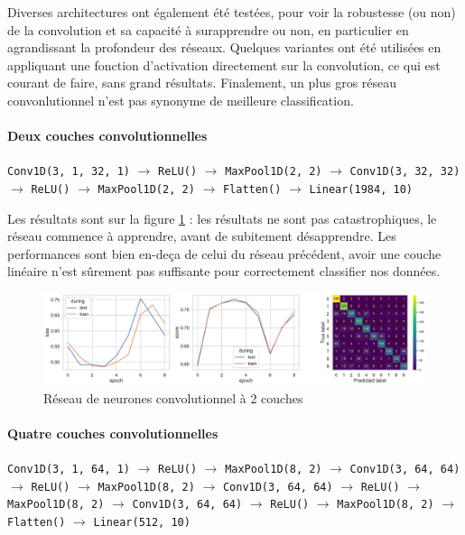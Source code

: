 \documentclass{article}
\begin{document}
Diverses architectures ont également été testées, pour voir la robustesse (ou non) de la convolution et sa capacité à surapprendre ou non, en particulier en agrandissant la profondeur des réseaux. Quelques variantes ont été utilisées en appliquant une fonction d'activation directement sur la convolution, ce qui est courant de faire, sans grand résultats. Finalement, un plus gros réseau convonlutionnel n'est pas synonyme de meilleure classification.

\paragraph*{Deux couches convolutionnelles} 

\texttt{Conv1D(3, 1, 32, 1)} $\rightarrow$ \texttt{ReLU()} $\rightarrow$ \texttt{MaxPool1D(2, 2)} $\rightarrow$
\texttt{Conv1D(3, 32, 32)} $\rightarrow$ \texttt{ReLU()} $\rightarrow$ \texttt{MaxPool1D(2, 2)} $\rightarrow$
\texttt{Flatten()} $\rightarrow$
\texttt{Linear(1984, 10)}

Les résultats sont sur la figure \ref*{fig:conv2layers} : les résultats ne sont pas catastrophiques, le réseau commence à apprendre, avant de subitement désapprendre. Les performances sont bien en-deça de celui du réseau précédent, avoir une couche linéaire n'est sûrement pas suffisante pour correctement classifier nos données.

\begin{figure}[htbp]
    \centering
    \includegraphics[width=\textwidth]{conv/conv_2layers.pdf}
    \caption{Réseau de neurones convolutionnel à 2 couches}
    \label{fig:conv2layers}
\end{figure}

\paragraph*{Quatre couches convolutionnelles}

\texttt{Conv1D(3, 1, 64, 1)} $\rightarrow$ \texttt{ReLU()} $\rightarrow$ \texttt{MaxPool1D(8, 2)} $\rightarrow$
\texttt{Conv1D(3, 64, 64)} $\rightarrow$ \texttt{ReLU()} $\rightarrow$ \texttt{MaxPool1D(8, 2)} $\rightarrow$
\texttt{Conv1D(3, 64, 64)} $\rightarrow$ \texttt{ReLU()} $\rightarrow$ \texttt{MaxPool1D(8, 2)} $\rightarrow$
\texttt{Conv1D(3, 64, 64)} $\rightarrow$ \texttt{ReLU()} $\rightarrow$ \texttt{MaxPool1D(8, 2)} $\rightarrow$
\texttt{Flatten()} $\rightarrow$
\texttt{Linear(512, 10)}
\end{document}
